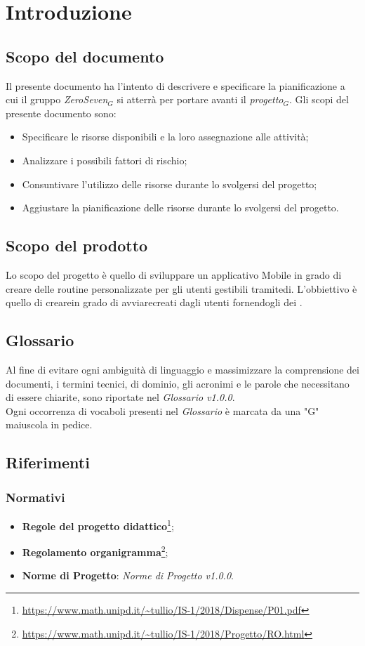 \chapter{Introduzione}
\section{Scopo del documento}
Il presente documento ha l'intento di descrivere e specificare la pianificazione a cui il gruppo \textit{ZeroSeven$_{G}$} si atterrà per portare avanti il \textit{progetto$_{G}$}.
Gli scopi del presente documento sono:
\begin{itemize}
	\item Specificare le risorse disponibili e la loro assegnazione alle attività;
	\item Analizzare i possibili fattori di rischio;
	\item Consuntivare l'utilizzo delle risorse durante lo svolgersi del progetto;
	\item Aggiustare la pianificazione delle risorse durante lo svolgersi del progetto.
\end{itemize}
\section{Scopo del prodotto}
Lo scopo del progetto è quello di sviluppare un applicativo Mobile in grado di creare delle routine personalizzate per gli utenti gestibili tramitedi. L'obbiettivo è quello di crearein grado di avviarecreati dagli utenti fornendogli dei .
\section{Glossario}
Al fine di evitare ogni ambiguità di linguaggio e massimizzare la comprensione dei documenti, i termini tecnici, di dominio, gli acronimi e le parole che necessitano di essere chiarite, sono riportate nel \textit{Glossario v1.0.0}.\\
Ogni occorrenza di vocaboli presenti nel \textit{Glossario} è marcata da una "G" maiuscola in pedice.
\section{Riferimenti}
\subsection{Normativi}
\label{normativi}
\begin{itemize}
	\item \textbf{Regole del progetto didattico}\footnote{\url{https://www.math.unipd.it/~tullio/IS-1/2018/Dispense/P01.pdf}};
	\item  \textbf{Regolamento organigramma}\footnote{\url{https://www.math.unipd.it/~tullio/IS-1/2018/Progetto/RO.html}};
	\item  \textbf{Norme di Progetto}: \textit{Norme di Progetto v1.0.0}.
\end{itemize}
